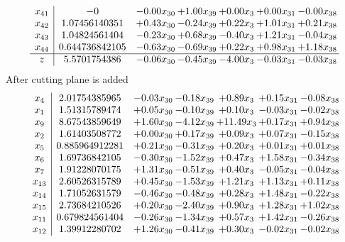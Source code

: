 \documentclass[8pt]{article}
\begin{document}
\[\begin{array}{c| c c@{\hskip 2pt} c@{\hskip 2pt} c@{\hskip 2pt} c@{\hskip 2pt} c@{\hskip 2pt} }
 x_{41}   &  -0 & -0.00 x_{30} & +  1.00 x_{39} & +  0.00 x_{3} & +  0.00 x_{31} & -0.00 x_{38}\\
 x_{42}   &  1.07456140351 & +  0.43 x_{30} & -0.24 x_{39} & +  0.22 x_{3} & +  1.01 x_{31} & +  0.21 x_{38}\\
 x_{43}   &  1.04824561404 & -0.23 x_{30} & +  0.68 x_{39} & -0.40 x_{3} & +  1.21 x_{31} & -0.04 x_{38}\\
 x_{44}   &  0.644736842105 & -0.63 x_{30} & -0.69 x_{39} & +  0.22 x_{3} & +  0.98 x_{31} & +  1.18 x_{38}\\
\hline
z    &  5.5701754386 & -0.06 x_{30} & -0.45 x_{39} & -4.00 x_{3} & -0.03 x_{31} & -0.03 x_{38}\\
\end{array}\]
 After cutting plane is added 
\[\begin{array}{c| c c@{\hskip 2pt} c@{\hskip 2pt} c@{\hskip 2pt} c@{\hskip 2pt} c@{\hskip 2pt} }
 x_{4}   &  2.01754385965 & -0.03 x_{30} & -0.18 x_{39} & +  0.89 x_{3} & +  0.15 x_{31} & -0.08 x_{38}\\
 x_{1}   &  1.51315789474 & +  0.05 x_{30} & -0.10 x_{39} & +  0.10 x_{3} & -0.03 x_{31} & -0.02 x_{38}\\
 x_{9}   &  8.67543859649 & +  1.60 x_{30} & -4.12 x_{39} & + 11.49 x_{3} & +  0.17 x_{31} & +  0.94 x_{38}\\
 x_{2}   &  1.61403508772 & +  0.00 x_{30} & +  0.17 x_{39} & +  0.09 x_{3} & +  0.07 x_{31} & -0.15 x_{38}\\
 x_{5}   &  0.885964912281 & +  0.21 x_{30} & -0.31 x_{39} & +  0.20 x_{3} & +  0.01 x_{31} & +  0.01 x_{38}\\
 x_{6}   &  1.69736842105 & -0.30 x_{30} & -1.52 x_{39} & +  0.47 x_{3} & +  1.58 x_{31} & -0.34 x_{38}\\
 x_{7}   &  1.91228070175 & +  1.31 x_{30} & -0.51 x_{39} & +  0.40 x_{3} & -0.05 x_{31} & -0.04 x_{38}\\
 x_{13}   &  2.60526315789 & +  0.45 x_{30} & -1.53 x_{39} & +  1.21 x_{3} & +  1.13 x_{31} & +  0.11 x_{38}\\
 x_{14}   &  1.71052631579 & -0.46 x_{30} & -0.48 x_{39} & +  0.28 x_{3} & +  1.48 x_{31} & -0.22 x_{38}\\
 x_{15}   &  2.73684210526 & +  0.20 x_{30} & -2.40 x_{39} & +  0.90 x_{3} & +  1.28 x_{31} & +  1.02 x_{38}\\
 x_{11}   &  0.679824561404 & -0.26 x_{30} & -1.34 x_{39} & +  0.57 x_{3} & +  1.42 x_{31} & -0.26 x_{38}\\
 x_{12}   &  1.39912280702 & +  1.26 x_{30} & -0.41 x_{39} & +  0.30 x_{3} & -0.02 x_{31} & -0.02 x_{38}\\

\end{array}\]
\end{document}
